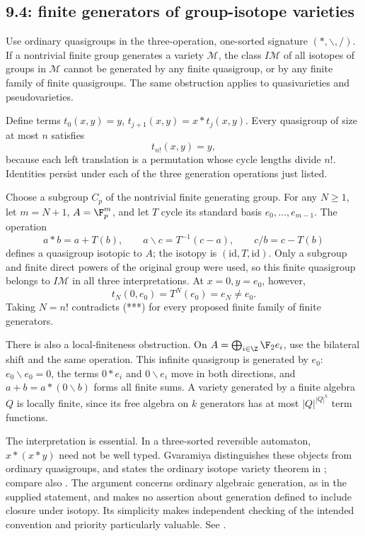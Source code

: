 \subsection{9.4: finite generators of group-isotope varieties}
\label{cand:9.4}
Use ordinary quasigroups in the three-operation, one-sorted signature
\((*,\backslash,/)\). If a nontrivial finite group generates a variety
\(\mathcal M\), the class \(I\mathcal M\) of all isotopes of groups in
\(\mathcal M\) cannot be generated by any finite quasigroup, or by any
finite family of finite quasigroups. The same obstruction applies to
quasivarieties and pseudovarieties.

Define terms \(t_0(x,y)=y\), \(t_{j+1}(x,y)=x*t_j(x,y)\).
Every quasigroup of size at most \(n\) satisfies
\[
 t_{n!}(x,y)=y,                                      \tag{***}
\]
because each left translation is a permutation whose cycle lengths
divide \(n!\). Identities persist under each of the three generation
operations just listed.

Choose a subgroup \(C_p\) of the nontrivial finite generating group.
For any \(N\ge1\), let \(m=N+1\), \(A=\F_p^m\), and let \(T\) cycle
its standard basis \(e_0,\ldots,e_{m-1}\).
The operation
\[
 a*b=a+T(b),\qquad
 a\backslash c=T^{-1}(c-a),\qquad c/b=c-T(b)
\]
defines a quasigroup isotopic to \(A\); the isotopy is
\((\mathrm{id},T,\mathrm{id})\). Only a subgroup and finite direct
powers of the original group were used, so this finite quasigroup
belongs to \(I\mathcal M\) in all three interpretations.
At \(x=0,y=e_0\), however,
\[
 t_N(0,e_0)=T^N(e_0)=e_N\ne e_0.
\]
Taking \(N=n!\) contradicts (***) for every proposed finite family of
finite generators.

There is also a local-finiteness obstruction. On
\(A=\bigoplus_{i\in\Z}\F_2e_i\), use the bilateral shift and the same
operation. This infinite quasigroup is generated by \(e_0\):
\(e_0\backslash e_0=0\), the terms \(0*e_i\) and
\(0\backslash e_i\) move in both directions, and
\(a+b=a*(0\backslash b)\) forms all finite sums.
A variety generated by a finite algebra \(Q\) is locally finite,
since its free algebra on \(k\) generators has at most
\(|Q|^{|Q|^k}\) term functions.

The interpretation is essential. In a three-sorted reversible automaton,
\(x*(x*y)\) need not be well typed. Gvaramiya distinguishes these
objects from ordinary quasigroups, and states the ordinary isotope
variety theorem in \cite[Section~3, Theorem~8]{gvaramiya-automata};
compare also \cite{krapez-marinkovic}.
The argument concerns ordinary algebraic generation, as in the supplied
statement, and makes no assertion about generation defined to include
closure under isotopy. Its simplicity makes independent checking of
the intended convention and priority particularly valuable.
See .
